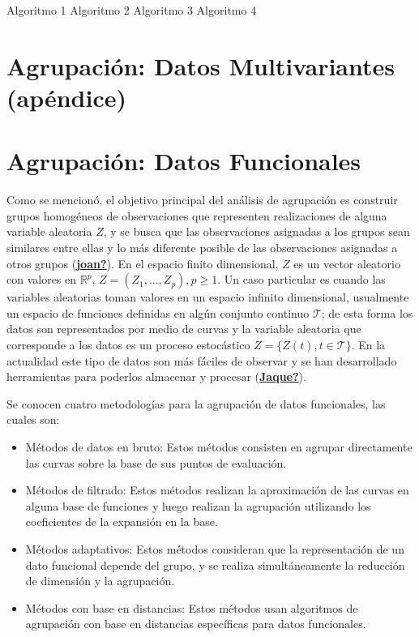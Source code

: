 \documentclass[
]{book}
\begin{document}
Algoritmo 1 Algoritmo 2 Algoritmo 3 Algoritmo 4

\hypertarget{agrupaciuxf3n-datos-multivariantes-apuxe9ndice}{%
\section{Agrupación: Datos Multivariantes (apéndice)}\label{agrupaciuxf3n-datos-multivariantes-apuxe9ndice}}

\hypertarget{agrupaciuxf3n-datos-funcionales}{%
\section{Agrupación: Datos Funcionales}\label{agrupaciuxf3n-datos-funcionales}}

Como se mencionó, el objetivo principal del análisis de agrupación es construir grupos homogéneos de observaciones que representen realizaciones de alguna variable aleatoria \(Z\), y se busca que las observaciones asignadas a los grupos sean similares entre ellas y lo más diferente posible de las observaciones asignadas a otros grupos (\protect\hyperlink{ref-joan}{\textbf{joan?}}). En el espacio finito dimensional, \(Z\) es un vector aleatorio con valores en \(\mathbb{R}^p\), \(Z=(Z_1,...,Z_p), p\geq 1\). Un caso particular es cuando las variables aleatorias toman valores en un espacio infinito dimensional, usualmente un espacio de funciones definidas en algún conjunto continuo \(\mathcal{T}\); de esta forma los datos son representados por medio de curvas y la variable aleatoria que corresponde a los datos es un proceso estocástico \(Z=\{Z(t),t \in \mathcal{T}\}\). En la actualidad este tipo de datos son más fáciles de observar y se han desarrollado herramientas para poderlos almacenar y procesar (\protect\hyperlink{ref-Jaque}{\textbf{Jaque?}}).

Se conocen cuatro metodologías para la agrupación de datos funcionales, las cuales son:

\begin{itemize}
\item
  Métodos de datos en bruto: Estos métodos consisten en agrupar directamente las curvas sobre la base de sus puntos de evaluación.
\item
  Métodos de filtrado: Estos métodos realizan la aproximación de las curvas en alguna base de funciones y luego realizan la agrupación utilizando los coeficientes de la expansión en la base.
\item
  Métodos adaptativos: Estos métodos consideran que la representación de un dato funcional depende del grupo, y se realiza simultáneamente la reducción de dimensión y la agrupación.
\item
  Métodos con base en distancias: Estos métodos usan algoritmos de agrupación con base en distancias específicas para datos funcionales.
\end{itemize}
\end{document}
